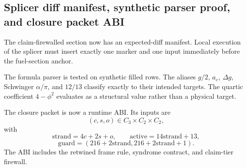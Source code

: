 \subsection{Splicer diff manifest, synthetic parser proof, and closure packet ABI}
\label{sec:bt1465-bt1467-splicer-synthetic-abi}

The claim-firewalled section now has an expected-diff manifest.  Local execution
of the splicer must insert exactly one marker and one input immediately before
the fuel-section anchor.

The formula parser is tested on synthetic filled rows.  The aliases \(g/2\),
\(a_e\), \(\Delta g\), Schwinger \(\alpha/\pi\), and \(12/13\) classify exactly
to their intended targets.  The quartic coefficient \(4-\phi^2\) evaluates as a
structural value rather than a physical target.

The closure packet is now a runtime ABI.  Its inputs are
\[
(c,s,o)\in C_3\times C_2\times C_2,
\]
with
\[
\mathrm{strand}=4c+2s+o,
\qquad
\mathrm{active}=14\mathrm{strand}+13,
\]
\[
\mathrm{guard}=(216+2\mathrm{strand},216+2\mathrm{strand}+1).
\]
The ABI includes the retwined frame rule, syndrome contract, and claim-tier
firewall.
